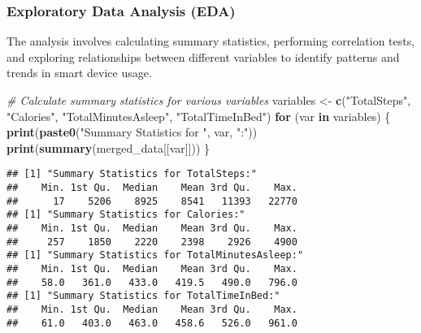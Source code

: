 \documentclass[
]{article}
\newenvironment{Shaded}{\begin{snugshade}}{\end{snugshade}}
\newcommand{\CommentTok}[1]{\textcolor[rgb]{0.56,0.35,0.01}{\textit{#1}}}
\newcommand{\ControlFlowTok}[1]{\textcolor[rgb]{0.13,0.29,0.53}{\textbf{#1}}}
\newcommand{\FunctionTok}[1]{\textcolor[rgb]{0.13,0.29,0.53}{\textbf{#1}}}
\newcommand{\NormalTok}[1]{#1}
\newcommand{\OtherTok}[1]{\textcolor[rgb]{0.56,0.35,0.01}{#1}}
\newcommand{\SpecialCharTok}[1]{\textcolor[rgb]{0.81,0.36,0.00}{\textbf{#1}}}
\newcommand{\StringTok}[1]{\textcolor[rgb]{0.31,0.60,0.02}{#1}}
\begin{document}
\hypertarget{exploratory-data-analysis-eda}{%
\subsubsection{Exploratory Data Analysis
(EDA)}\label{exploratory-data-analysis-eda}}

The analysis involves calculating summary statistics, performing
correlation tests, and exploring relationships between different
variables to identify patterns and trends in smart device usage.

\begin{Shaded}
\begin{Highlighting}[]
\CommentTok{\# Calculate summary statistics for various variables}
\NormalTok{variables }\OtherTok{\textless{}{-}} \FunctionTok{c}\NormalTok{(}\StringTok{"TotalSteps"}\NormalTok{, }\StringTok{"Calories"}\NormalTok{, }\StringTok{"TotalMinutesAsleep"}\NormalTok{, }\StringTok{"TotalTimeInBed"}\NormalTok{)}
\ControlFlowTok{for}\NormalTok{ (var }\ControlFlowTok{in}\NormalTok{ variables) \{}
  \FunctionTok{print}\NormalTok{(}\FunctionTok{paste0}\NormalTok{(}\StringTok{"Summary Statistics for "}\NormalTok{, var, }\StringTok{":"}\NormalTok{))}
  \FunctionTok{print}\NormalTok{(}\FunctionTok{summary}\NormalTok{(merged\_data[[var]]))}
\NormalTok{\}}
\end{Highlighting}
\end{Shaded}

\begin{verbatim}
## [1] "Summary Statistics for TotalSteps:"
##    Min. 1st Qu.  Median    Mean 3rd Qu.    Max. 
##      17    5206    8925    8541   11393   22770 
## [1] "Summary Statistics for Calories:"
##    Min. 1st Qu.  Median    Mean 3rd Qu.    Max. 
##     257    1850    2220    2398    2926    4900 
## [1] "Summary Statistics for TotalMinutesAsleep:"
##    Min. 1st Qu.  Median    Mean 3rd Qu.    Max. 
##    58.0   361.0   433.0   419.5   490.0   796.0 
## [1] "Summary Statistics for TotalTimeInBed:"
##    Min. 1st Qu.  Median    Mean 3rd Qu.    Max. 
##    61.0   403.0   463.0   458.6   526.0   961.0
\end{verbatim}

\begin{Shaded}
\end{Shaded}
\end{document}
